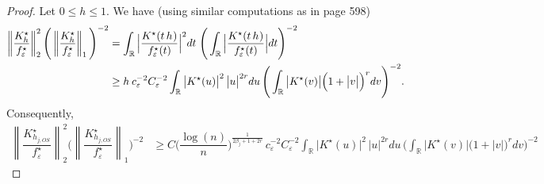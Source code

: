 \documentclass[11pt,a4paper,openany]{article}
\def\R{\mathbb{R}}
\begin{document}
\begin{proof}
Let $0 \leq h \leq 1$. We have (using similar computations as in \cite{Comte-Lacour} page 598)
	\begin{align*}
		\left\| \dfrac{K^{\star}_{h} }{ f_{\varepsilon}^{\star} }   \right\|_{2}^{2}   \Bigg( \left\| \dfrac{K^{\star}_{h} }{ f_{\varepsilon}^{\star} }   \right\|_{1} \Bigg)^{-2}    
		&=    \int_{\R}  \Big| \dfrac{K^{\star}(t \, h_{}) }{ f_{\varepsilon}^{\star}(t) } \Big|^{2} dt   \hspace{0.1cm}  \Bigg( \int_{\R}  \Big| \dfrac{K^{\star}(t \, h_{}) }{ f_{\varepsilon}^{\star}(t) } \Big| dt    \Bigg)^{-2}
		\\
		&\geq  h_{}  \,   c_{\varepsilon}^{-2}   C_{\varepsilon}^{-2}    \int_{\R}  \big| K^{\star}(u) \big|^{2}  \,  \big| u \big|^{2r}   du   \,  \Bigg( \int_{\R}  \big| K^{\star}(v) \big|  \Big( 1 + \big| v \big| \Big)^{r} dv    \Bigg)^{-2}.  
				\end{align*}
				Consequently, 
				\begin{align}
		\left\| \dfrac{K^{\star}_{h_{j,OS}} }{ f_{\varepsilon}^{\star} }   \right\|_{2}^{2}   \Bigg( \left\| \dfrac{K^{\star}_{h_{j,OS}} }{ f_{\varepsilon}^{\star} }   \right\|_{1} \Bigg)^{-2}    		& \geq C \Big( \dfrac{\log(n)}{n} \Big)^{\frac{1}{2 \beta_{j} + 1 + 2r}}  \,   c_{\varepsilon}^{-2}   C_{\varepsilon}^{-2}    \int_{\R}  \big| K^{\star}(u) \big|^{2}  \,  \big| u \big|^{2r}   du   \,  \Bigg( \int_{\R}  \big| K^{\star}(v) \big|  \Big( 1 + \big| v \big| \Big)^{r} dv    \Bigg)^{-2}    

\end{align}
\end{proof}
\end{document}
